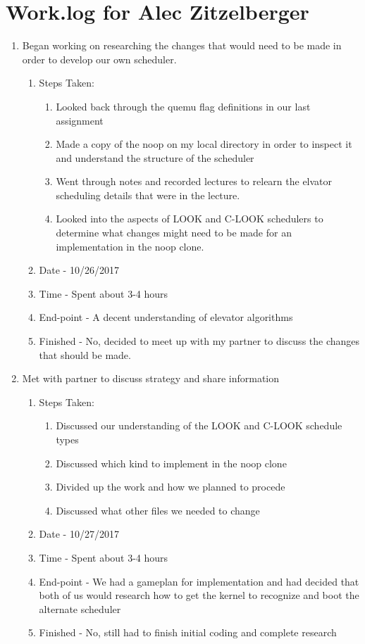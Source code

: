 \documentclass[journal,10pt,onecolumn,compsoc]{IEEEtran} \usepackage[margin=1.0in]{geometry} \usepackage{pdfpages}
\begin{document}
\section {Work.log for Alec Zitzelberger}
\begin{enumerate}
	\item Began working on researching the changes that would need to be made in order to develop our own scheduler.
		\begin{enumerate}
			\item Steps Taken:
				\begin{enumerate}
					\item Looked back through the quemu flag definitions in our last assignment
                    \item Made a copy of the noop on my local directory in order to inspect it and understand the structure of the scheduler
                    \item Went through notes and recorded lectures to relearn the elvator scheduling details that were in the lecture.
					\item Looked into the aspects of LOOK and C-LOOK schedulers to determine what changes might need to be made for an implementation in the noop clone.
				\end{enumerate}
			\item Date - 10/26/2017
			\item Time - Spent about 3-4 hours
			\item End-point - A decent understanding of elevator algorithms
			\item Finished - No, decided to meet up with my partner to discuss the changes that should be made. \\
		\end {enumerate}
        
	\item Met with partner to discuss strategy and share information
		\begin{enumerate}
			\item Steps Taken:
				\begin{enumerate}
					\item Discussed our understanding of the LOOK and C-LOOK schedule types
                    \item Discussed which kind to implement in the noop clone
                    \item Divided up the work and how we planned to procede
                    \item Discussed what other files we needed to change
				\end{enumerate}
			\item Date - 10/27/2017
			\item Time - Spent about 3-4 hours
			\item End-point - We had a gameplan for implementation and had decided that both of us would research how to get the kernel to recognize and boot the alternate scheduler
			\item Finished - No, still had to finish initial coding and complete research \\
		\end {enumerate}
        

\end{enumerate}
\end{document}
